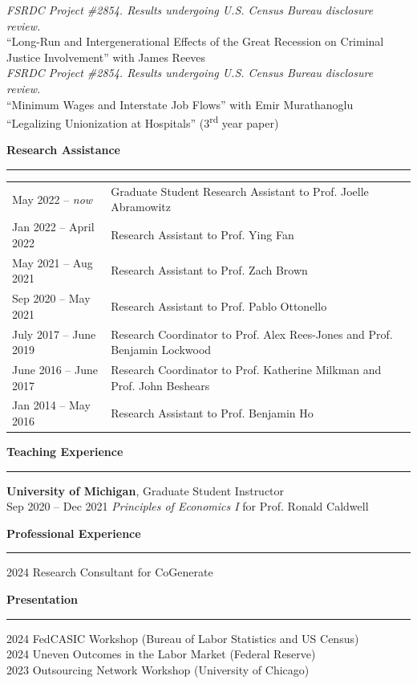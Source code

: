 \documentclass[12pt,letterpaper]{article}
\newcommand{\cvheading}[1]{%
    \par\vspace{0.5cm}
    {\Large \textbf{#1}}
    \vspace{0.1cm}
    \hrule
    \vspace{0.2cm}
}
\begin{document}
\textit{FSRDC Project \#2854. Results undergoing U.S. Census Bureau disclosure review.}
\\[0.2cm]
``Long-Run and Intergenerational Effects of the Great Recession on Criminal Justice Involvement'' with James Reeves \\
\textit{FSRDC Project \#2854. Results undergoing U.S. Census Bureau disclosure review.}
\\[0.2cm]
``Minimum Wages and Interstate Job Flows'' with Emir Murathanoglu
\\[0.2cm]
``Legalizing Unionization at Hospitals'' (3\textsuperscript{rd} year paper)
\newpage
\cvheading{Research Assistance}
\begin{tabular}{l l}
May 2022 -- \textit{now} & Graduate Student Research Assistant to Prof. Joelle Abramowitz \\
Jan 2022 -- April 2022 & Research Assistant to Prof. Ying Fan \\
May 2021 -- Aug 2021 & Research Assistant to Prof. Zach Brown \\
Sep 2020 -- May 2021 & Research Assistant to Prof. Pablo Ottonello \\
July 2017 -- June 2019 & Research Coordinator to Prof. Alex Rees-Jones and Prof. Benjamin Lockwood \\
June 2016 -- June 2017 & Research Coordinator to Prof. Katherine Milkman and Prof. John Beshears \\
Jan 2014 -- May 2016 & Research Assistant to Prof. Benjamin Ho\\
\end{tabular}
\cvheading{Teaching Experience}
\textbf{University of Michigan}, Graduate Student Instructor \\
Sep 2020 -- Dec 2021 \hspace{0.5cm} \textit{Principles of Economics I} for Prof. Ronald Caldwell
\cvheading{Professional Experience}
2024 \hspace{0.5cm} Research Consultant for CoGenerate
\cvheading{Presentation}
2024 \hspace{0.5cm} FedCASIC Workshop (Bureau of Labor Statistics and US Census)
\\[0.1cm]
2024 \hspace{0.5cm} Uneven Outcomes in the Labor Market (Federal Reserve)
\\[0.1cm]
2023 \hspace{0.5cm} Outsourcing Network Workshop (University of Chicago)
\end{document}
